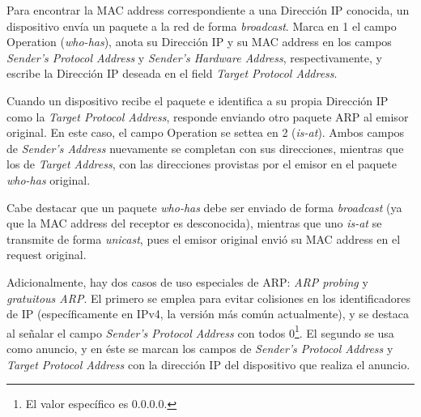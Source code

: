 \par Para encontrar la MAC address correspondiente a una Dirección IP conocida, un dispositivo envía un paquete a la red de forma \textit{broadcast}.
Marca en 1 el campo Operation (\textit{who-has}), anota su Dirección IP y su MAC address en los campos \textit{Sender's Protocol Address} y \textit{Sender's Hardware Address}, respectivamente, y escribe la Dirección IP deseada en el field \textit{Target Protocol Address}.

\par Cuando un dispositivo recibe el paquete e identifica a su propia Dirección IP como la \textit{Target Protocol Address}, responde enviando otro paquete ARP al emisor original.
En este caso, el campo Operation se settea en 2 (\textit{is-at}).
Ambos campos de \textit{Sender's Address} nuevamente se completan con sus direcciones, mientras que los de \textit{Target Address}, con las direcciones provistas por el emisor en el paquete \textit{who-has} original.

\par Cabe destacar que un paquete \textit{who-has} debe ser enviado de forma \textit{broadcast} (ya que la MAC address del receptor es desconocida), mientras que uno \textit{is-at} se transmite de forma \textit{unicast}, pues el emisor original envió su MAC address en el request original.

\par Adicionalmente, hay dos casos de uso especiales de ARP: \textit{ARP probing} y \textit{gratuitous ARP}.
El primero se emplea para evitar colisiones en los identificadores de IP (específicamente en IPv4, la versión más común actualmente), y se destaca al señalar el campo \textit{Sender's Protocol Address} con todos 0\footnote{El valor específico es 0.0.0.0.}.
El segundo se usa como anuncio, y en éste se marcan los campos de \textit{Sender's Protocol Address} y \textit{Target Protocol Address} con la dirección IP del dispositivo que realiza el anuncio. 
